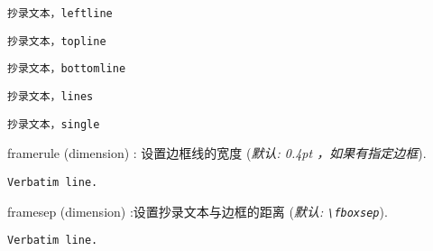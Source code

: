 \documentclass[twoside]{article}
\newcommand\cs[1]{\texttt{\textbackslash#1}}
\providecommand\optname[1]{\textsf{#1}}
\newenvironment{optlist}{\begin{description}%
  \renewcommand\makelabel[1]{%
    \descriptionlabel{\mdseries\optname{##1}}}%
  \itemsep0.25\itemsep}%
 {\end{description}}
\begin{document}
\begin{SideBySideExample}
  \begin{Verbatim}[frame=leftline]
    抄录文本，leftline
  \end{Verbatim}
\end{SideBySideExample}

\begin{SideBySideExample}
  \begin{Verbatim}[frame=topline]
    抄录文本，topline
  \end{Verbatim}
\end{SideBySideExample}

\begin{SideBySideExample}
  \begin{Verbatim}[frame=bottomline]
    抄录文本，bottomline
  \end{Verbatim}
\end{SideBySideExample}

\begin{SideBySideExample}
  \begin{Verbatim}[frame=lines]
    抄录文本，lines
  \end{Verbatim}
\end{SideBySideExample}

\begin{SideBySideExample}
  \begin{Verbatim}[frame=single]
    抄录文本，single
  \end{Verbatim}
\end{SideBySideExample}

\begin{optlist}
  \item[framerule (dimension)]: 设置边框线的宽度
  (\emph{默认: 0.4pt ，如果有指定边框}).
\end{optlist}

\begin{SideBySideExample}
  \begin{Verbatim}[frame=single,
                   framerule=1mm]
    Verbatim line.
  \end{Verbatim}
\end{SideBySideExample}

\begin{optlist}
  \item[framesep (dimension)]:设置抄录文本与边框的距离 (\emph{默认: \cs{fboxsep}}).
\end{optlist}

\begin{SideBySideExample}
  \begin{Verbatim}[frame=single,
                   framesep=5mm]
    Verbatim line.
  \end{Verbatim}
\end{SideBySideExample}
\end{document}
